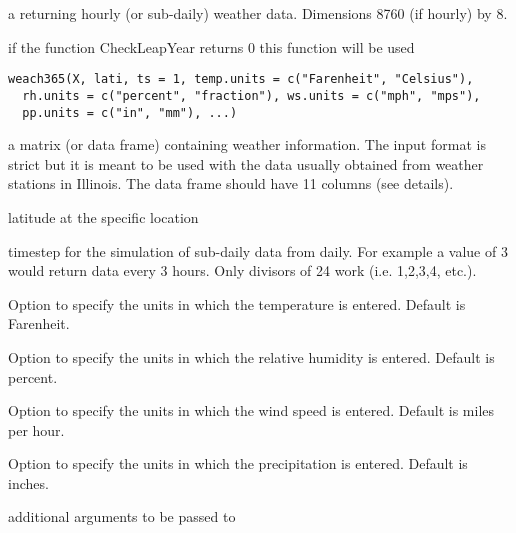 \documentclass[letterpaper]{book}
\begin{document}
%
\begin{Value}
a  returning hourly (or sub-daily)
weather data. Dimensions 8760 (if hourly) by 8.
\end{Value}
%
\begin{Examples}
\end{Examples}
%
\begin{Description}\relax
if the function CheckLeapYear returns 0 this function will
be used
\end{Description}
%
\begin{Usage}
\begin{verbatim}
weach365(X, lati, ts = 1, temp.units = c("Farenheit", "Celsius"),
  rh.units = c("percent", "fraction"), ws.units = c("mph", "mps"),
  pp.units = c("in", "mm"), ...)
\end{verbatim}
\end{Usage}
%
\begin{Arguments}
\begin{ldescription}
\item[\code{X}] a matrix (or data frame) containing weather
information.  The input format is strict but it is meant
to be used with the data usually obtained from weather
stations in Illinois. The data frame should have 11
columns (see details).

\item[\code{lati}] latitude at the specific location

\item[\code{ts}] timestep for the simulation of sub-daily data
from daily. For example a value of 3 would return data
every 3 hours. Only divisors of 24 work (i.e. 1,2,3,4,
etc.).

\item[\code{temp.units}] Option to specify the units in which
the temperature is entered. Default is Farenheit.

\item[\code{rh.units}] Option to specify the units in which the
relative humidity is entered. Default is percent.

\item[\code{ws.units}] Option to specify the units in which the
wind speed is entered. Default is miles per hour.

\item[\code{pp.units}] Option to specify the units in which the
precipitation is entered. Default is inches.

\item[\code{list()}] additional arguments to be passed to
\end{ldescription}
\end{Arguments}
\end{document}
